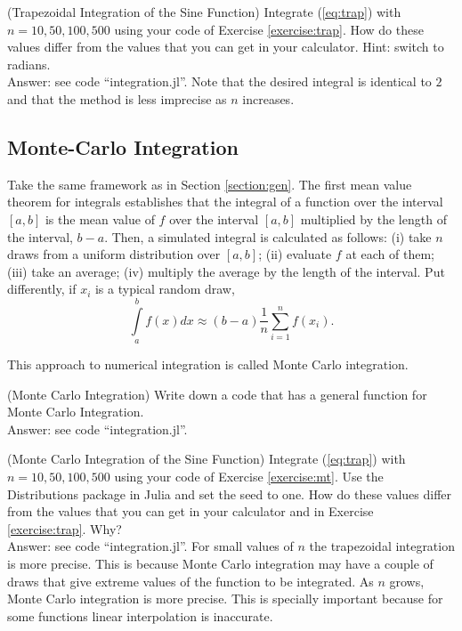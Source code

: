 \begin{exercise} (Trapezoidal Integration of the Sine Function)
Integrate (\ref{eq:trap}) with $n=10,50,100,500$ using your code of Exercise \ref{exercise:trap}. How do these values differ from the values that you can get in your calculator. Hint: switch to radians.\\
\noindent  Answer: see code ``integration.jl''. Note that the desired integral is identical to $2$ and that the method is less imprecise as $n$ increases.
\end{exercise}

\subsection{Monte-Carlo Integration}
Take the same framework as in Section \ref{section:gen}.  The first mean value theorem for integrals establishes that the integral of a function over the interval $[a,b]$ is the mean value of $f$ over the interval $[a,b]$ multiplied by the length of the interval, $b-a$. Then, a simulated integral is calculated as follows: (i) take $n$ draws from a uniform distribution over $[a,b]$; (ii) evaluate $f$ at each of them; (iii) take an average; (iv) multiply the average by the length of the interval. Put differently, if $x_{i}$ is a typical random draw,
\begin{equation}
\int \limits _{a} ^{b} f(x)dx \approx (b-a) \frac{1}{n} \sum \limits _{i=1} ^{n} f(x_{i}). 
\end{equation}  

\noindent This approach to numerical integration is called Monte Carlo integration.

\begin{exercise} (Monte Carlo Integration) \label{exercise:mt}
Write down a code that has a general function for Monte Carlo Integration.\\
\noindent Answer:  see code ``integration.jl''.
\end{exercise}

\begin{exercise} (Monte Carlo Integration of the Sine Function)
Integrate (\ref{eq:trap}) with $n=10,50,100,500$ using your code of Exercise \ref{exercise:mt}. Use the Distributions package in Julia and set the seed to one. How do these values differ from the values that you can get in your calculator and in Exercise \ref{exercise:trap}. Why?\\
\noindent Answer:  see code ``integration.jl''. For small values of $n$ the trapezoidal integration is more precise. This is because Monte Carlo integration may have a couple of draws that give extreme values of the function to be integrated. As $n$ grows, Monte Carlo integration is more precise. This is specially important because for some functions linear interpolation is inaccurate. 
\end{exercise}

